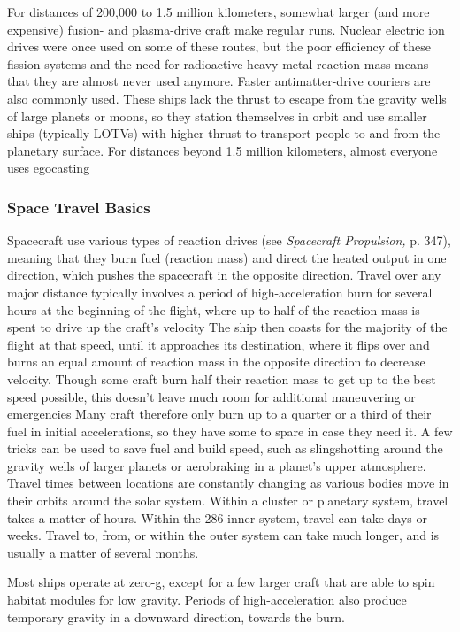 For distances of 200,000 to 1.5 million kilometers, somewhat larger (and more expensive) fusion- and plasma-drive craft make regular runs. Nuclear electric ion drives were once used on some of these routes, but the poor efficiency of these fission systems and the need for radioactive heavy metal reaction mass means that they are almost never used anymore. Faster antimatter-drive couriers are also commonly used. These ships lack the thrust to escape from the gravity wells of large planets or moons, so they station themselves in orbit and use smaller ships (typically LOTVs) with higher thrust to transport people to and from the planetary surface. For distances beyond 1.5 million kilometers, almost everyone uses egocasting 

\subsubsection{Space Travel Basics} 

Spacecraft use various types of reaction drives (see \textit{Spacecraft Propulsion,} p. 347), meaning that they burn fuel (reaction mass) and direct the heated output in one direction, which pushes the spacecraft in the opposite direction. Travel over any major distance typically involves a period of high-acceleration burn for several hours at the beginning of the flight, where up to half of the reaction mass is spent to drive up the craft's velocity The ship then coasts for the majority of the flight at that speed, until it approaches its destination, where it flips over and burns an equal amount of reaction mass in the opposite direction to decrease velocity. Though some craft burn half their reaction mass to get up to the best speed possible, this doesn't leave much room for additional maneuvering or emergencies Many craft therefore only burn up to a quarter or a third of their fuel in initial accelerations, so they have some to spare in case they need it. A few tricks can be used to save fuel and build speed, such as slingshotting around the gravity wells of larger planets or aerobraking in a planet's upper atmosphere. Travel times between locations are constantly changing as various bodies move in their orbits around the solar system. Within a cluster or planetary system, travel takes a matter of hours. Within the 286 inner system, travel can take days or weeks. Travel to, from, or within the outer system can take much longer, and is usually a matter of several months. 

Most ships operate at zero-g, except for a few larger craft that are able to spin habitat modules for low gravity. Periods of high-acceleration also produce temporary gravity in a downward direction, towards the burn. 

